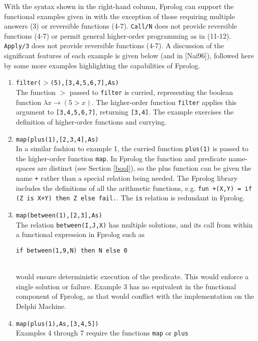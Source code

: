 \documentclass[a4paper,11pt,twoside]{article}
\begin{document}
With the syntax shown in the right-hand column, Fprolog can support the 
functional examples given in \cite{Nai96} with the exception of those requiring
multiple answers (3) or reversible functions (4-7).  \texttt{Call/N} does not
provide reversible functions (4-7) or permit general higher-order programming
as in (11-12).  \texttt{Apply/3} does not provide reversible functions (4-7).
A discussion of the significant features of each example is given below
(and in [Nai96]), followed here
by some more examples highlighting the capabilities of Fprolog.

\begin{enumerate}
\item{\texttt{filter($>$(5),[3,4,5,6,7],As)}\\
  The function $>$ passed to \texttt{filter} is curried, representing the 
  boolean function $\lambda x \rightarrow (5 > x)$.  The higher-order function
  \texttt{filter} applies this argument to \texttt{[3,4,5,6,7]}, returning
  \texttt{[3,4]}.  The example exercises the definition of higher-order functions
  and currying.}
\item{\texttt{map(plus(1),[2,3,4],As)}\\
  In a similar fashion to example 1, the curried function \texttt{plus(1)} is
  passed to the higher-order function \texttt{map}.  In Fprolog the function and
  predicate name-spaces are distinct (see Section \ref{bool}), so the plus function
  can be given the name \texttt{+} rather than a special relation being needed.  The
  Fprolog library includes the definitions of all the arithmetic functions, e.g.
  \mbox{\texttt{fun +(X,Y) = if (Z is X+Y) then Z else fail.}}.  The \texttt{is}
  relation is redundant in Fprolog.}
\item{\texttt{map(between(1),[2,3],As)}\\
  The relation \texttt{between(I,J,X)} has multiple solutions, and its call
  from within a functional expression in Fprolog such as\\ 
  \centerline{\mbox{\texttt{if between(1,9,N) then N else 0}}}\\
  would ensure deterministic execution of
  the predicate.  This would enforce a single solution or failure.  Example 3 has no
  equivalent in the functional component of Fprolog, as that would conflict with
  the implementation on the Delphi Machine.}
\item{\texttt{map(plus(1),As,[3,4,5])}\\
  Examples 4 through 7 require the functions \texttt{map} or \texttt{plus}
}
\end{enumerate}
\end{document}
